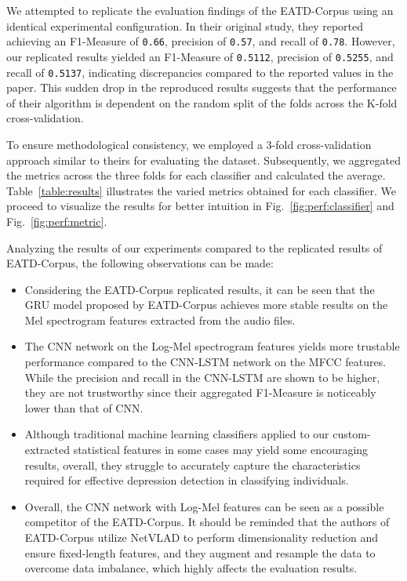 We attempted to replicate the evaluation findings of the EATD-Corpus using an identical experimental configuration. In their original study, they reported achieving an F1-Measure of \texttt{0.66}, precision of \texttt{0.57}, and recall of \texttt{0.78}. However, our replicated results yielded an F1-Measure of \texttt{0.5112}, precision of \texttt{0.5255}, and recall of \texttt{0.5137}, indicating discrepancies compared to the reported values in the paper. This sudden drop in the reproduced results suggests that the performance of their algorithm is dependent on the random split of the folds across the K-fold cross-validation.

To ensure methodological consistency, we employed a 3-fold cross-validation approach similar to theirs for evaluating the dataset. Subsequently, we aggregated the metrics across the three folds for each classifier and calculated the average. Table~\ref{table:results} illustrates the varied metrics obtained for each classifier. We proceed to visualize the results for better intuition in  Fig.~\ref{fig:perf:classifier} and Fig.~\ref{fig:perf:metric}.

Analyzing the results of our experiments compared to the replicated results of EATD-Corpus, the following observations can be made:

\begin{itemize}[]

    \item Considering the EATD-Corpus replicated results, it can be seen that the GRU model proposed by EATD-Corpus achieves more stable results on the Mel spectrogram features extracted from the audio files.
    
    \item The CNN network on the Log-Mel spectrogram features yields more trustable performance compared to the CNN-LSTM network on the MFCC features. While the precision and recall in the CNN-LSTM are shown to be higher, they are not trustworthy since their aggregated F1-Measure is noticeably lower than that of CNN.

    \item Although traditional machine learning classifiers applied to our custom-extracted statistical features in some cases may yield some encouraging results, overall, they struggle to accurately capture the characteristics required for effective depression detection in classifying individuals.

    \item Overall, the CNN network with Log-Mel features can be seen as a possible competitor of the EATD-Corpus. It should be reminded that the authors of EATD-Corpus utilize NetVLAD to perform dimensionality reduction and ensure fixed-length features, and they augment and resample the data to overcome data imbalance, which highly affects the evaluation results.
    
\end{itemize}

